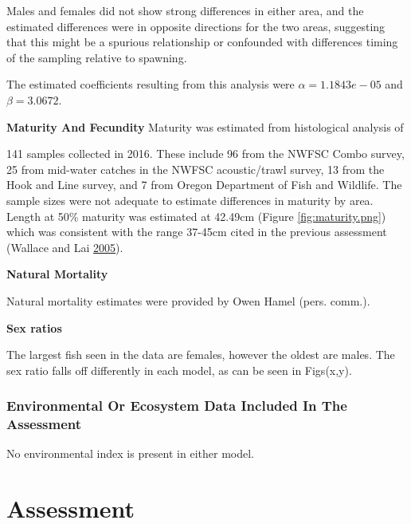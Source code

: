 \documentclass[12pt,]{article}
\begin{document}
Males and females did not show strong differences in either area, and
the estimated differences were in opposite directions for the two areas,
suggesting that this might be a spurious relationship or confounded with
differences timing of the sampling relative to spawning.

The estimated coefficients resulting from this analysis were
\(\alpha = 1.1843e-05\) and \(\beta = 3.0672\).

\vspace{.5cm}

\textbf{Maturity And Fecundity} Maturity was estimated from histological
analysis of

141 samples collected in 2016. These include 96 from the NWFSC Combo
survey, 25 from mid-water catches in the NWFSC acoustic/trawl survey, 13
from the Hook and Line survey, and 7 from Oregon Department of Fish and
Wildlife. The sample sizes were not adequate to estimate differences in
maturity by area. Length at 50\% maturity was estimated at 42.49cm
(Figure \ref{fig:maturity.png}) which was consistent with the range
37-45cm cited in the previous assessment (Wallace and Lai
\protect\hyperlink{ref-Wallace2005}{2005}).

\vspace{.5cm}

\textbf{Natural Mortality}

Natural mortality estimates were provided by Owen Hamel (pers. comm.).

\vspace{.5cm}

\textbf{Sex ratios}

The largest fish seen in the data are females, however the oldest are
males. The sex ratio falls off differently in each model, as can be seen
in Figs(x,y).

\subsubsection{Environmental Or Ecosystem Data Included In The
Assessment}\label{environmental-or-ecosystem-data-included-in-the-assessment}

No environmental index is present in either model.

\newpage

\section{Assessment}\label{assessment}
\end{document}
